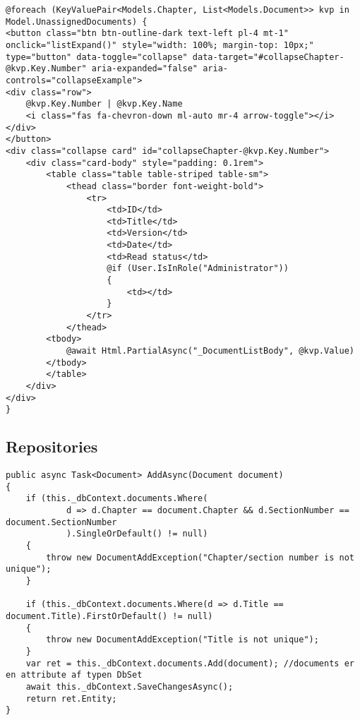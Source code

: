 \begin{lstlisting}
@foreach (KeyValuePair<Models.Chapter, List<Models.Document>> kvp in Model.UnassignedDocuments) {
<button class="btn btn-outline-dark text-left pl-4 mt-1" onclick="listExpand()" style="width: 100%; margin-top: 10px;" type="button" data-toggle="collapse" data-target="#collapseChapter-@kvp.Key.Number" aria-expanded="false" aria-controls="collapseExample">
<div class="row">
	@kvp.Key.Number | @kvp.Key.Name
	<i class="fas fa-chevron-down ml-auto mr-4 arrow-toggle"></i>
</div>
</button>
<div class="collapse card" id="collapseChapter-@kvp.Key.Number">
	<div class="card-body" style="padding: 0.1rem">
		<table class="table table-striped table-sm">
			<thead class="border font-weight-bold">
				<tr>
					<td>ID</td>
					<td>Title</td>
					<td>Version</td>
					<td>Date</td>
					<td>Read status</td>
					@if (User.IsInRole("Administrator"))
					{
						<td></td>
					}
				</tr>
			</thead>
		<tbody>
			@await Html.PartialAsync("_DocumentListBody", @kvp.Value)
		</tbody>
		</table>
	</div>
</div>
}

\end{lstlisting}

\subsection{Repositories}

\begin{lstlisting}
public async Task<Document> AddAsync(Document document)
{
	if (this._dbContext.documents.Where(
			d => d.Chapter == document.Chapter && d.SectionNumber == document.SectionNumber
			).SingleOrDefault() != null)
	{
		throw new DocumentAddException("Chapter/section number is not unique");
	}

	if (this._dbContext.documents.Where(d => d.Title == document.Title).FirstOrDefault() != null)
	{
		throw new DocumentAddException("Title is not unique");
	}
	var ret = this._dbContext.documents.Add(document); //documents er en attribute af typen DbSet
	await this._dbContext.SaveChangesAsync();
	return ret.Entity;
}
\end{lstlisting}


